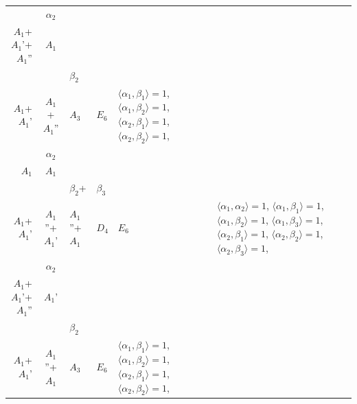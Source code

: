 \documentclass[12pt]{report}
\begin{document}
\begin{appendix}
{\begin{longtable}{rcl p{1cm}p{1cm}p{3cm} }
\begin{tabular}{cc}$\alpha_1$+ & $\alpha_2$\\\tiny{ $A_1$+$A_1$'+$A_1$'' } & \tiny{ $A_1$ }\end{tabular} &\begin{tabular}{c} = \\~ \end{tabular} & \begin{tabular}{cc}$\beta_1$+ & $\beta_2$\\\tiny{ $A_1$+$A_1$' } & \tiny{ $A_1$+$A_1$'' }\end{tabular} & $A_3$ & $E_6$ &  $\langle\alpha_1, \beta_1\rangle=1$, $\langle\alpha_1, \beta_2\rangle=1$, $\langle\alpha_2, \beta_1\rangle=1$, $\langle\alpha_2, \beta_2\rangle=1$, 
\\
\begin{tabular}{cc}$\alpha_1$+ & $\alpha_2$\\\tiny{ $A_1$ } & \tiny{ $A_1$ }\end{tabular} &\begin{tabular}{c} = \\~ \end{tabular} & \begin{tabular}{ccc}$\beta_1$+ & $\beta_2$+ & $\beta_3$\\\tiny{ $A_1$+$A_1$' } & \tiny{ $A_1$''+$A_1$' } & \tiny{ $A_1$''+$A_1$ }\end{tabular} & $D_4$ & $E_6$ & $\langle\alpha_1, \alpha_2\rangle=1$,  $\langle\alpha_1, \beta_1\rangle=1$, $\langle\alpha_1, \beta_2\rangle=1$, $\langle\alpha_1, \beta_3\rangle=1$, $\langle\alpha_2, \beta_1\rangle=1$, $\langle\alpha_2, \beta_2\rangle=1$, $\langle\alpha_2, \beta_3\rangle=1$, 
\\
\begin{tabular}{cc}$\alpha_1$+ & $\alpha_2$\\\tiny{ $A_1$+$A_1$'+$A_1$'' } & \tiny{ $A_1$' }\end{tabular} &\begin{tabular}{c} = \\~ \end{tabular} & \begin{tabular}{cc}$\beta_1$+ & $\beta_2$\\\tiny{ $A_1$+$A_1$' } & \tiny{ $A_1$''+$A_1$ }\end{tabular} & $A_3$ & $E_6$ &  $\langle\alpha_1, \beta_1\rangle=1$, $\langle\alpha_1, \beta_2\rangle=1$, $\langle\alpha_2, \beta_1\rangle=1$, $\langle\alpha_2, \beta_2\rangle=1$, 
\\

\end{longtable}}
\end{appendix}
\end{document}
